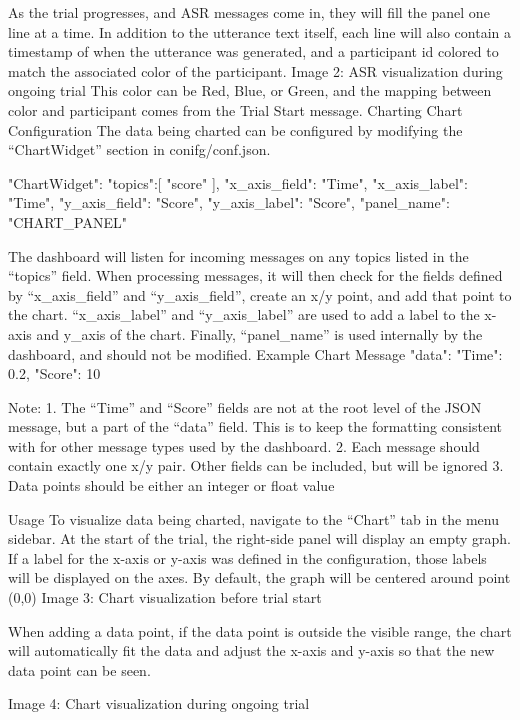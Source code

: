As the trial progresses, and ASR messages come in, they will fill the panel one line at a time. In addition to the utterance text itself, each line will also contain a timestamp of when the utterance was generated, and a participant id colored to match the associated color of the participant.
Image 2: ASR visualization during ongoing trial
This color can be Red, Blue, or Green, and the mapping between color and participant comes from the Trial Start message.
Charting
Chart Configuration
The data being charted can be configured by modifying the “ChartWidget” section in conifg/conf.json.

"ChartWidget":{
             	"topics":[
                    	"score"
            	],
            	"x_axis_field": "Time",
            	"x_axis_label": "Time",
            	"y_axis_field": "Score",
            	"y_axis_label": "Score",
            	"panel_name": "CHART_PANEL"
 }

The dashboard will listen for incoming messages on any topics listed in the “topics” field. When processing messages, it will then check for the fields defined by “x_axis_field” and “y_axis_field”, create an x/y point, and add that point to the chart. “x_axis_label” and “y_axis_label” are used to add a label to the x-axis and y_axis of the chart. Finally, “panel_name” is used internally by the dashboard, and should not be modified.
Example Chart Message
{
    	"data":{
            	"Time": 0.2,
            	"Score": 10
    	}
}



Note:
1. The “Time” and “Score” fields are not at the root level of the JSON message, but a part of the “data” field. This is to keep the formatting consistent with for other message types used by the dashboard.
2. Each message should contain exactly one x/y pair. Other fields can be included, but will be ignored
3. Data points should be either an integer or float value

Usage
To visualize data being charted, navigate to the “Chart” tab in the menu sidebar. At the start of the trial, the right-side panel will display an empty graph. If a label for the x-axis or y-axis was defined in the configuration, those labels will be displayed on the axes.  By default, the graph will be centered around point (0,0)
Image 3: Chart visualization before trial start

When adding a data point, if the data point is outside the visible range, the chart will automatically fit the data and adjust the x-axis and y-axis so that the new data point can be seen.


Image 4: Chart visualization during ongoing trial
